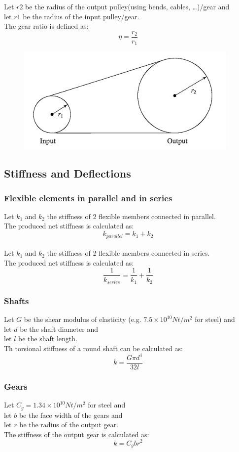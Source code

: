 \documentclass[10pt,a4paper]{article}
\begin{document}
Let $r2$ be the radius of the output pulley(using bends, cables, \dots)/gear and \\
let $r1$ be the radius of the input pulley/gear. \\
The gear ratio is defined as:
$$
	\eta = \frac{r_2}{r_1}
$$

\begin{figure}[H]
	\includegraphics[width=0.5\columnwidth]{imgs/pulleys.png}
\end{figure}

\subsection{Stiffness and Deflections}
\subsubsection{Flexible elements in parallel and in series}
Let $k_1$ and $k_2$ the stiffness of 2 flexible members connected in parallel. \\
The produced net stiffness is calculated as:
$$
	k_{parallel} = k_1 + k_2
$$
\\

Let $k_1$ and $k_2$ the stiffness of 2 flexible members connected in series. \\
The produced net stiffness is calculated as:
$$
	\frac{1}{k_{series}} = \frac{1}{k_1} + \frac{1}{k_2}
$$

\subsubsection{Shafts}
Let $G$ be the shear modulus of elasticity (e.g. $7.5 \times 10^{10} Nt/m^2$ for steel) and \\
let $d$ be the shaft diameter and \\
let $l$ be the shaft length. \\
Th torsional stiffness of a round shaft can be calculated as:
$$
	k = \frac{G\pi d^4}{32l}
$$

\subsubsection{Gears}
Let $C_g = 1.34 \times 10^{10} Nt/m^2$ for steel and \\
let $b$ be the face width of the gears and \\
let $r$ be the radius of the output gear. \\
The stiffness of the output gear is calculated as:
$$
	k = C_gbr^2
$$
\\
\end{document}
